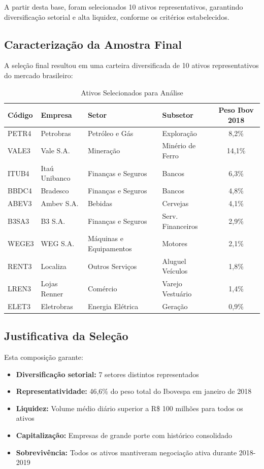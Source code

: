 A partir desta base, foram selecionados 10 ativos representativos, garantindo diversificação setorial e alta liquidez, conforme os critérios estabelecidos.

\subsection{Caracterização da Amostra Final}

A seleção final resultou em uma carteira diversificada de 10 ativos representativos do mercado brasileiro:

\begin{table}[H]
\centering
\caption{Ativos Selecionados para Análise}
\begin{tabular}{llllc}
\toprule
\textbf{Código} & \textbf{Empresa} & \textbf{Setor} & \textbf{Subsetor} & \textbf{Peso Ibov 2018} \\
\midrule
PETR4 & Petrobras & Petróleo e Gás & Exploração & 8,2\% \\
VALE3 & Vale S.A. & Mineração & Minério de Ferro & 14,1\% \\
ITUB4 & Itaú Unibanco & Finanças e Seguros & Bancos & 6,3\% \\
BBDC4 & Bradesco & Finanças e Seguros & Bancos & 4,8\% \\
ABEV3 & Ambev S.A. & Bebidas & Cervejas & 4,1\% \\
B3SA3 & B3 S.A. & Finanças e Seguros & Serv. Financeiros & 2,9\% \\
WEGE3 & WEG S.A. & Máquinas e Equipamentos & Motores & 2,1\% \\
RENT3 & Localiza & Outros Serviços & Aluguel Veículos & 1,8\% \\
LREN3 & Lojas Renner & Comércio & Varejo Vestuário & 1,4\% \\
ELET3 & Eletrobras & Energia Elétrica & Geração & 0,9\% \\
\bottomrule
\end{tabular}
\label{tab:ativos_selecionados}
\end{table}

\subsection{Justificativa da Seleção}

Esta composição garante:
\begin{itemize}
    \item \textbf{Diversificação setorial:} 7 setores distintos representados
    \item \textbf{Representatividade:} 46,6\% do peso total do Ibovespa em janeiro de 2018
    \item \textbf{Liquidez:} Volume médio diário superior a R\$ 100 milhões para todos os ativos
    \item \textbf{Capitalização:} Empresas de grande porte com histórico consolidado
    \item \textbf{Sobrevivência:} Todos os ativos mantiveram negociação ativa durante 2018-2019
\end{itemize}

